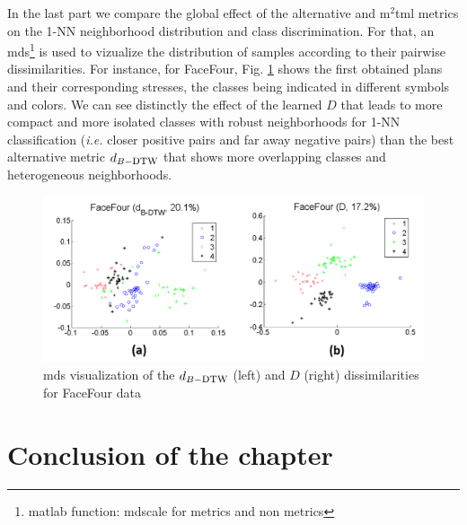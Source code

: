 In the last part we compare the global effect of the alternative and {\sc m}$^2${\sc tml} metrics  on the 1-NN neighborhood distribution and class discrimination. For that, an  {\sc mds}\footnote{matlab function: mdscale for metrics and non metrics} is used to vizualize  the distribution of samples according to their pairwise  dissimilarities.
For instance, for FaceFour, Fig. \ref{fig:mds} shows the first obtained plans and their corresponding stresses, the classes being indicated in different symbols and colors. We can see distinctly the effect of the learned  $D$ that leads to  more compact and more isolated classes with  robust  neighborhoods for 1-NN classification ({\it i.e.} closer positive pairs and far away negative pairs) than  the best alternative metric $d_{B-\mbox{\sc dtw}}$ that shows more overlapping classes and heterogeneous neighborhoods.
\begin{figure}[h!]
	\centering
	\includegraphics[width=1\linewidth]{images/FaceFour}
	\caption{{\sc mds} visualization of the $d_{B-\mbox{\sc dtw}}$ (left) and $D$ (right) dissimilarities for FaceFour data}
	\label{fig:mds}
\end{figure} 

\newpage
\section{Conclusion of the chapter}
